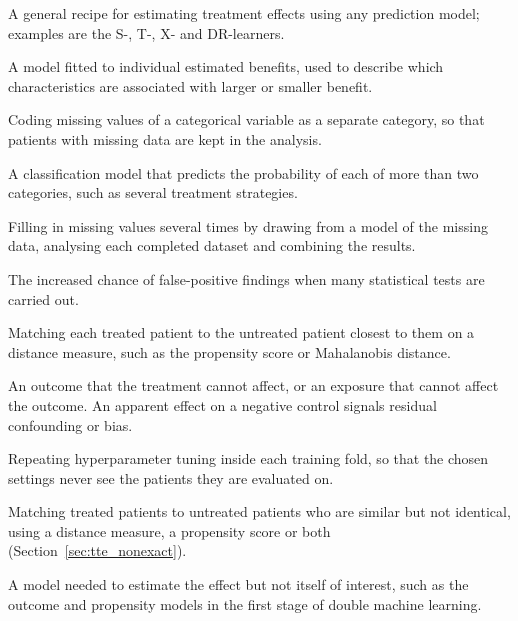 \begin{description}[style=nextline, leftmargin=1.2em, itemsep=3pt, font=\normalfont\bfseries]
\item[Meta-learner]
A general recipe for estimating treatment effects using any prediction model; examples are the S-, T-, X- and DR-learners.

\item[Meta-model]
A model fitted to individual estimated benefits, used to describe which characteristics are associated with larger or smaller benefit.

\item[Missing as its own category]
Coding missing values of a categorical variable as a separate category, so that patients with missing data are kept in the analysis.

\item[Multiclass model]
A classification model that predicts the probability of each of more than two categories, such as several treatment strategies.

\item[Multiple imputation]
Filling in missing values several times by drawing from a model of the missing data, analysing each completed dataset and combining the results.

\item[Multiplicity]
The increased chance of false-positive findings when many statistical tests are carried out.

\item[Nearest-neighbour matching]
Matching each treated patient to the untreated patient closest to them on a distance measure, such as the propensity score or Mahalanobis distance.

\item[Negative control]
An outcome that the treatment cannot affect, or an exposure that cannot affect the outcome. An apparent effect on a negative control signals residual confounding or bias.

\item[Nested tuning]
Repeating hyperparameter tuning inside each training fold, so that the chosen settings never see the patients they are evaluated on.

\item[Non-exact matching]
Matching treated patients to untreated patients who are similar but not identical, using a distance measure, a propensity score or both (Section~\ref{sec:tte_nonexact}).

\item[Nuisance model]
A model needed to estimate the effect but not itself of interest, such as the outcome and propensity models in the first stage of double machine learning.


\end{description}
